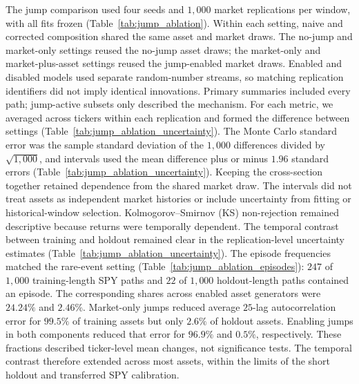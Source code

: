 The jump comparison used four seeds and $1{,}000$ market
replications per window, with all fits frozen (Table~\ref{tab:jump_ablation}). Within each setting,
naive and corrected composition shared the same asset and market
draws. The no-jump and market-only settings reused the no-jump asset
draws; the market-only and market-plus-asset settings reused the
jump-enabled market draws. Enabled and disabled models used separate
random-number streams, so matching replication identifiers did not
imply identical innovations. Primary summaries included every path;
jump-active subsets only described the mechanism.
For each metric, we averaged across tickers within each replication
and formed the difference between settings
(Table~\ref{tab:jump_ablation_uncertainty}). The Monte Carlo standard
error was the sample standard deviation of the $1{,}000$ differences
divided by $\sqrt{1{,}000}$, and intervals used the mean difference
plus or minus $1.96$ standard errors
(Table~\ref{tab:jump_ablation_uncertainty}). Keeping the cross-section
together retained dependence from the shared market draw. The
intervals did not treat assets as independent market histories or
include uncertainty from fitting or historical-window selection.
Kolmogorov--Smirnov (KS) non-rejection remained descriptive because
returns were temporally dependent.
The temporal contrast between training and holdout remained clear
in the replication-level uncertainty estimates
(Table~\ref{tab:jump_ablation_uncertainty}). The episode frequencies
matched the rare-event setting (Table~\ref{tab:jump_ablation_episodes}):
$247$ of
$1{,}000$ training-length SPY paths and $22$ of $1{,}000$ holdout-length
paths contained an episode. The corresponding shares across enabled
asset generators were $24.24\%$ and $2.46\%$. Market-only jumps
reduced average $25$-lag autocorrelation error for $99.5\%$ of
training assets but only $2.6\%$ of holdout assets. Enabling jumps in
both components reduced that error for $96.9\%$ and $0.5\%$,
respectively. These fractions described ticker-level mean changes,
not significance tests. The temporal contrast therefore extended
across most assets, within the limits of the short holdout and
transferred SPY calibration.

\begin{table}[H]
  \centering
  \caption{\textbf{Monte Carlo uncertainty in the effect of jump settings
    under corrected composition.} Differences are relative to jumps
    disabled, with $1{,}000$ market replications per window.
    $\Delta$ACF$_{25}$ is the change in mean absolute error of the
    absolute-return autocorrelation function through lag $25$;
    negative values indicate improved temporal fit.
    $\Delta$KS is the change in Kolmogorov--Smirnov non-rejection
    rate in percentage points. Brackets contain approximate $95\%$
    Monte Carlo (MC) intervals conditional on the fitted models and
    observed histories.}
  \label{tab:jump_ablation_uncertainty}
  \footnotesize
  \setlength{\tabcolsep}{4pt}
  
\end{table}

